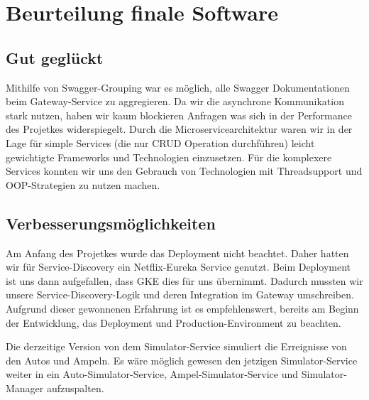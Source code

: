 \section{Beurteilung finale Software}

\subsection{Gut geglückt}
Mithilfe von Swagger-Grouping war es möglich, alle Swagger Dokumentationen beim Gateway-Service zu aggregieren.
Da wir die asynchrone Kommunikation stark nutzen, haben wir kaum blockieren Anfragen was sich in der Performance des Projetkes widerspiegelt.
Durch die Microservicearchitektur waren wir in der Lage für simple Services (die nur CRUD Operation durchführen) leicht gewichtigte Frameworks und Technologien
einzusetzen. Für die komplexere Services konnten wir uns den Gebrauch von Technologien mit Threadsupport und OOP-Strategien zu nutzen machen.

\subsection{Verbesserungsmöglichkeiten}
Am Anfang des Projetkes wurde das Deployment nicht beachtet. Daher hatten wir für Service-Discovery ein Netflix-Eureka
Service genutzt. Beim Deployment ist uns dann aufgefallen, dass GKE dies für uns übernimmt. Dadurch mussten wir unsere
Service-Discovery-Logik und deren Integration im Gateway umschreiben. Aufgrund dieser gewonnenen Erfahrung ist es empfehlenswert,
bereits am Beginn der Entwicklung, das Deployment und Production-Environment zu beachten.

Die derzeitige Version von dem Simulator-Service simuliert die Erreignisse von den Autos und Ampeln. Es wäre möglich gewesen
den jetzigen Simulator-Service weiter in ein Auto-Simulator-Service, Ampel-Simulator-Service und Simulator-Manager aufzuspalten.

